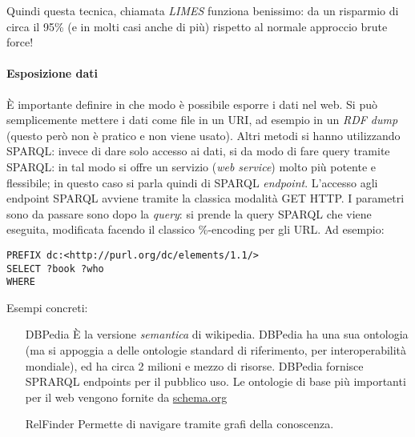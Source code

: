 Quindi questa tecnica, chiamata \textit{LIMES} funziona benissimo: da un risparmio di circa il 95\% (e in molti casi anche di pi\`u) rispetto al normale approccio brute force!

\paragraph*{Esposizione dati}\`E importante definire in che modo \`e possibile esporre i dati nel web. Si pu\`o semplicemente mettere i dati come file in un URI, ad esempio in un \textit{RDF dump} (questo per\`o non \`e pratico e non viene usato). Altri metodi si hanno utilizzando SPARQL: invece di dare solo accesso ai dati, si da modo di fare query tramite SPARQL: in tal modo si offre un servizio (\textit{web service}) molto pi\`u potente e flessibile; in questo caso si parla quindi di SPARQL \textit{endpoint}. L'accesso agli endpoint SPARQL avviene tramite la classica modalit\`a GET HTTP. I parametri sono da passare sono dopo la \textit{query}: si prende la query SPARQL che viene eseguita, modificata facendo il classico \%-encoding per gli URL.
Ad esempio:
\begin{verbatim}
PREFIX dc:<http://purl.org/dc/elements/1.1/>
SELECT ?book ?who
WHERE 
\end{verbatim}

Esempi concreti:
\begin{itemize}
\item[DBPedia] \`E la versione \textit{semantica} di wikipedia. DBPedia ha una sua ontologia (ma si appoggia a delle ontologie standard di riferimento, per interoperabilit\`a mondiale), ed ha circa 2 milioni e mezzo di risorse. DBPedia fornisce SPRARQL endpoints per il pubblico uso.
Le ontologie di base pi\`u importanti per il web vengono fornite da \url{schema.org}

\item[RelFinder] Permette di navigare tramite grafi della conoscenza.

\end{itemize}
